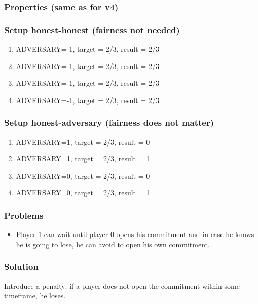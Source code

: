 \documentclass{article}
\begin{document}


\subsubsection{Properties (same as for v4)}



\subsubsection{Setup honest-honest (fairness not needed)}

\begin{enumerate}
\item ADVERSARY=-1, target = 2/3, result = 2/3
\item ADVERSARY=-1, target = 2/3, result = 2/3
\item ADVERSARY=-1, target = 2/3, result = 2/3
\item ADVERSARY=-1, target = 2/3, result = 2/3
\end{enumerate}

\subsubsection{Setup honest-adversary (fairness does not matter)}

\begin{enumerate}
\item ADVERSARY=1, target = 2/3, result = 0
\item ADVERSARY=1, target = 2/3, result = 1
\item ADVERSARY=0, target = 2/3, result = 0
\item ADVERSARY=0, target = 2/3, result = 1
\end{enumerate}

\subsubsection{Problems}

\begin{itemize}
\item Player 1 can wait until player 0 opens his commitment and in case he knows he is going to lose, he can 
avoid to open his own commitment.
\end{itemize}

\subsubsection{Solution}
Introduce a penalty: if a player does not open the commitment within some timeframe, he loses.
\end{document}
